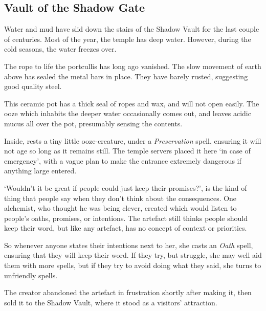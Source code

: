 \subsection{Vault of the Shadow Gate}

Water and mud have slid down the stairs of the Shadow Vault for the last couple of centuries.
Most of the year, the temple has deep water.
However, during the cold seasons, the water freezes over.




The rope to life the portcullis has long ago vanished.
The slow movement of earth above has sealed the metal bars in place.
They have barely rusted, suggesting good quality steel.





This ceramic pot has a thick seal of ropes and wax, and will not open easily.
The ooze which inhabits the deeper water  occasionally comes out, and leaves acidic mucus all over the pot, presumably sensing the contents.

Inside, rests a tiny little ooze-creature, under a \textit{Preservation} spell, ensuring it will not age so long as it remains still.
The temple \glspl{server} placed it here `in case of emergency', with a vague plan to make the entrance extremely dangerous if anything large entered.



\begin{exampletext}
  `Wouldn't it be great if people could just keep their promises?', is the kind of thing that people say when they don't think about the consequences.
  One alchemist, who thought he was being clever, created  which would listen to people's oaths, promises, or intentions.
  The \gls{artefact} still thinks people should keep their word, but like any \gls{artefact}, has no concept of context or priorities.

  So whenever anyone states their intentions next to her, she casts an \textit{Oath} spell, ensuring that they will keep their word.
  If they try, but struggle, she may well aid them with more spells, but if they try to avoid doing what they said, she turns to unfriendly spells.

  The creator abandoned the \gls{artefact} in frustration shortly after making it, then sold it to the Shadow Vault, where it stood as a visitors' attraction.
\end{exampletext}

